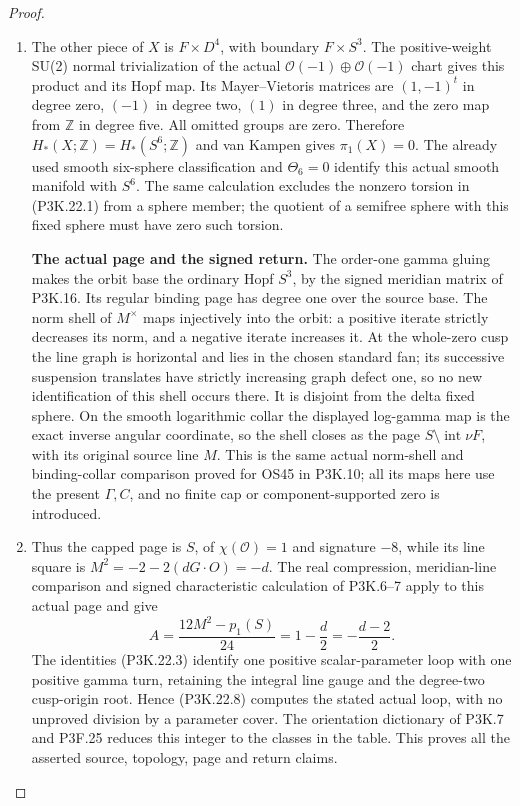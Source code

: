 \begin{proof}
\begin{enumerate}[label=\arabic*.]
\item The other piece of \(X\) is \(F\times D^4\), with boundary
\(F\times S^3\).  The positive-weight SU(2) normal trivialization
of the actual \(\mathcal O(-1)\oplus\mathcal O(-1)\) chart gives
this product and its Hopf map.  Its Mayer--Vietoris matrices are
\((1,-1)^t\) in degree zero, \((-1)\) in degree two,
\((1)\) in degree three, and the zero map from \(\mathbb Z\)
in degree five.  All omitted groups are zero.  Therefore
\(H_*(X;\mathbb Z)=H_*(S^6;\mathbb Z)\) and van Kampen gives
\(\pi_1(X)=0\).  The already used smooth six-sphere classification
and \(\Theta_6=0\) identify this actual smooth manifold with
\(S^6\).  The same calculation excludes the nonzero torsion in
(P3K.22.1) from a sphere member; the quotient of a semifree sphere
with this fixed sphere must have zero such torsion.

\par\medskip\noindent\textbf{The actual page and the signed return.}\enspace
The order-one gamma gluing makes the orbit base the ordinary Hopf
\(S^3\), by the signed meridian matrix of P3K.16.  Its regular
binding page has degree one over the source base.  The norm shell
of \(M^\times\) maps injectively into the orbit: a positive iterate
strictly decreases its norm, and a negative iterate increases it.
At the whole-zero cusp the line graph is horizontal and lies in
the chosen standard fan; its successive suspension translates have
strictly increasing graph defect one, so no new identification of
this shell occurs there.  It is disjoint from the delta fixed
sphere.  On the smooth logarithmic collar the displayed log-gamma
map is the exact inverse angular coordinate, so the shell closes
as the page \(S\setminus\operatorname{int}\nu F\), with its
original source line \(M\).  This is the same actual norm-shell
and binding-collar comparison proved for OS45 in P3K.10; all its
maps here use the present \(\Gamma,C\), and no finite cap or
component-supported zero is introduced.

\item Thus the capped page is \(S\), of \(\chi(\mathcal O)=1\) and
signature \(-8\), while its line square is
\(M^2=-2-2(dG\cdot O)=-d\).  The real compression, meridian-line
comparison and signed characteristic calculation of P3K.6--7 apply
to this actual page and give
\[
 A=\frac{12M^2-p_1(S)}{24}
   =1-\frac d2=-\frac{d-2}{2}.                        \tag{P3K.22.8}
\]
The identities (P3K.22.3) identify one positive scalar-parameter
loop with one positive gamma turn, retaining the integral line
gauge and the degree-two cusp-origin root.  Hence (P3K.22.8)
computes the stated actual loop, with no unproved division by a
parameter cover.  The orientation dictionary of P3K.7 and P3F.25
reduces this integer to the classes in the table.  This proves all
the asserted source, topology, page and return claims.

\end{enumerate}
\end{proof}